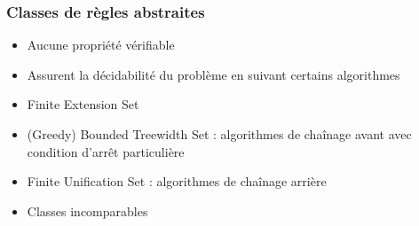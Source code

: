 \begin{frame}[t]
	\frametitle{Classes de règles abstraites}
	\vspace{10mm}
	\begin{itemize}
		\item Aucune propriété vérifiable
		\item Assurent la décidabilité du problème en suivant certains algorithmes
		\item Finite Extension Set
		\item (Greedy) Bounded Treewidth Set : algorithmes de chaînage avant avec condition
			d'arrêt particulière
		\item Finite Unification Set : algorithmes de chaînage arrière
		\item Classes incomparables
	\end{itemize}
\end{frame}

